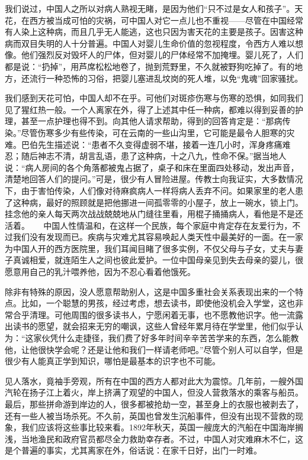\documentclass[12pt,oneside]{book}
\begin{document}
\begin{common-format}
我们说过，中国人之所以对病人熟视无睹，是因为他们“只不过是女人和孩子”。天花，在西方被当成可怕的灾祸，可中国人对它一点儿也不重视——尽管在中国经常有人染上这种病，而且几乎无人能逃，这也只因为害天花的主要是孩子。因害这种病而双目失明的人十分普遍。中国人对婴儿生命价值的忽视程度，令西方人难以想像。他们强烈反对毁坏人的尸体，但对婴儿的尸体经常不加掩埋。婴儿死了，人们都是说：“扔掉”，用芦席松松地卷了，抛到荒野里，不久就被野狗吃掉了。有的地方，还流行一种恐怖的习俗，把婴儿塞进乱坟岗的死人堆，以免“鬼魂”回家骚扰。 

我们感到天花可怕，中国人却不在乎。可他们对斑疹伤寒与伤寒的恐惧，如同我们见了猩红热一般。一个人离家在外，得了上述其中任一种病，都难以得到妥善的护理，甚至一点护理也得不到。向其他人请求帮助，得到的回答肯定是：“那病传染。”尽管伤寒多少有些传染，可在云南的一些山沟里，它可能是最令人胆寒的灾难。巴伯先生描述说：“患者不久变得虚弱不堪，接着一连几小时，浑身疼痛难忍；随后神志不清，胡言乱语，患了这种病，十之八九，性命不保。”据当地人说：“病人房间的各个角落都被鬼占据了，桌子和床在里面四处移动，发出声音，清楚地回答人们的提问。”可是，很少有人冒险进屋。传教士向我证实，大多数情况下，由于害怕传染，人们像对待麻疯病人一样将病人丢弃不问。如果家里的老人患了这种病，最好的照顾就是把他挪进一间孤零零的小屋子，放上一碗水，锁上门。挂念他的亲人每天两次战战兢兢地从门缝往里看，用棍子捅捅病人，看他是不是还活着。 
　
中国人性情温和，在这样一个民族，每个家庭中肯定存在友爱行为，不过我们没有发现而已。疾病与灾难尤其容易唤起人类天性中最美好的一面。在一家为中国人开的西方医院里，我们耳闻目睹了很多实例，不仅父母与子女，丈夫与妻子真诚相爱，就连陌生人之间也彼此爱护。一位中国母亲见到失去母亲的婴儿，很愿意用自己的乳汁喂养他，因为不忍心看着他饿死。 

除非有特殊的原因，没人愿意帮助别人，这是中国多重社会关系表现出来的一个特点。比如，一个聪慧的男孩，经过考虑，想去读书，即使他没机会入学堂，这也非常合乎清理。可他周围的很多读书人，宁愿闲着无事，也不愿教他识字。他一流露出读书的愿望，就会招来无穷的嘲讽，这些人曾经年累月待在学堂里，他们似乎认为：“这家伙凭什么走捷径，我们费了好多年时间辛辛苦苦学来的东西，怎么能教他，让他很快学会呢？还是让他和我们一样请老师吧。”尽管个别人可以自学，但是很少有人能真正学到知识，哪怕是最基本的识字也不可能。 

见人落水，竟袖手旁观，所有在中国的西方人都对此大为震惊。几年前，一艘外国汽轮在扬子江上着火，岸上挤满了观望的中国人，但没人营救落水的乘客与船员。最后，那些拼命游到岸边的人，很多都被抢劫一空，甚至身上的衣服也被剥去了，还有一些人被当场杀死。不久前，英国也曾发生沉船事件，但没有出现不营救的现象，我们应该将这些事比较来看。1892年秋天，英国一艘庞大的汽船在中国海岸搁浅，当地渔民和政府官员都尽全力救助幸存者。不过，中国人对灾难麻木不仁，这是个普遍的事实，尤其离家在外，俗话说：在家千日好，出门一时难。 


\end{common-format}
\end{document}
